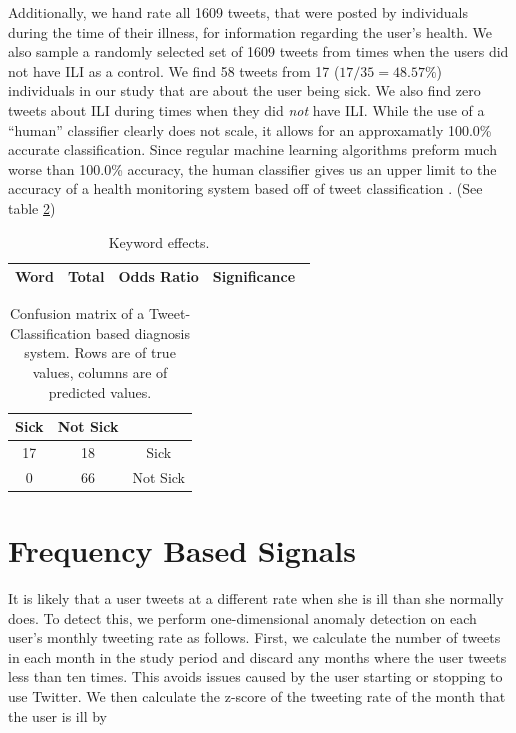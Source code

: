 \documentclass{acm_proc_article-sp}
\begin{document}
Additionally, we hand rate all 1609 tweets, that were posted by individuals during the time of their illness,  for information regarding the user's health.  We also sample a randomly selected set of 1609 tweets from times when the users did not have ILI as a control. We find 58 tweets from 17 (\(17/35 = 48.57\%\))  individuals in our study that are about the user being sick. We also find zero tweets about ILI during times when they did \textit{not} have ILI. While the use of a ``human'' classifier clearly does not scale, it allows for an approxamatly 100.0\% accurate classification. Since regular machine learning algorithms preform much worse than 100.0\% accuracy, the human classifier gives us an upper limit to the accuracy of  a health monitoring system based off of tweet classification . (See table \ref{tab:tweet_classified_confusion})


%

\begin{table}
\centering
\begin{tabular}{|c|c|c|c|} \hline
Word& Total &Odds Ratio & Significance\ \\ \hline

\end{tabular}
\caption{Keyword effects.}
\label{tab:tweet_keyword_expert_results}
\end{table}


\begin{table}
\centering
\begin{tabular}{|c|c|c|} \hline
Sick&Not Sick&\ \\ \hline
17 & 18 & Sick\\ \hline
0 & 66  & Not Sick\\
\hline\end{tabular}
\caption{Confusion matrix of a Tweet-Classification based diagnosis system. Rows are of true values, columns are of predicted values.}
\label{tab:tweet_classified_confusion}
\end{table}

\section{Frequency Based Signals}

It is likely that a user tweets at a different rate when she is ill than she normally does. To detect this, we perform one-dimensional anomaly detection on each user's monthly tweeting rate as follows. First, we calculate the number of tweets in each month in the study period and discard any months where the user tweets less than ten times. This avoids issues caused by the user starting or stopping to use Twitter. We then calculate the z-score of the tweeting rate of the month that the user is ill by
\end{document}
